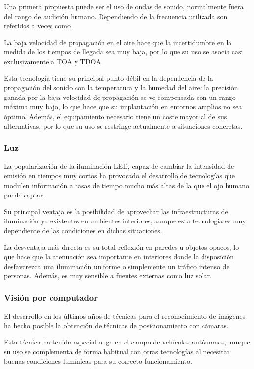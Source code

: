Una primera propuesta puede ser el uso de ondas de sonido, normalmente fuera del rango de audición humano. Dependiendo de la frecuencia utilizada son referidos a veces como .

La baja velocidad de propagación en el aire hace que la incertidumbre en la medida de los tiempos de llegada sea muy baja, por lo que su uso se asocia casi exclusivamente a TOA y TDOA.

Esta tecnología tiene su principal punto débil en la dependencia de la propagación del sonido con la temperatura y la humedad del aire: la precisión ganada por la baja velocidad de propagación se ve compensada con un rango máximo muy bajo, lo que hace que su implantación en entornos amplios no sea óptimo.
Además, el equipamiento necesario tiene un coste mayor al de sus alternativas, por lo que su uso se restringe actualmente a situaciones concretas.

\subsubsection{Luz}

La popularización de la iluminación LED, capaz de cambiar la intensidad de emisión en tiempos muy cortos ha provocado el desarrollo de tecnologías que modulen información a tasas de tiempo mucho más altas de la que el ojo humano puede captar.

Su principal ventaja es la posibilidad de aprovechar las infraestructuras de iluminación ya existentes en ambientes interiores, aunque esta tecnología es muy dependiente de las condiciones en dichas situaciones.

La desventaja más directa es su total reflexión en paredes u objetos opacos, lo que hace que la atenuación sea importante en interiores donde la disposición desfavorezca una iluminación uniforme o simplemente un tráfico intenso de personas.
Además, es muy sensible a fuentes externas como luz solar.

\subsubsection{Visión por computador}

El desarrollo en los últimos años de técnicas para el reconocimiento de imágenes ha hecho posible la obtención de técnicas de posicionamiento con cámaras.

Esta técnica ha tenido especial auge en el campo de vehículos autónomos, aunque su uso se complementa de forma habitual con otras tecnologías al necesitar buenas condiciones lumínicas para su correcto funcionamiento.

